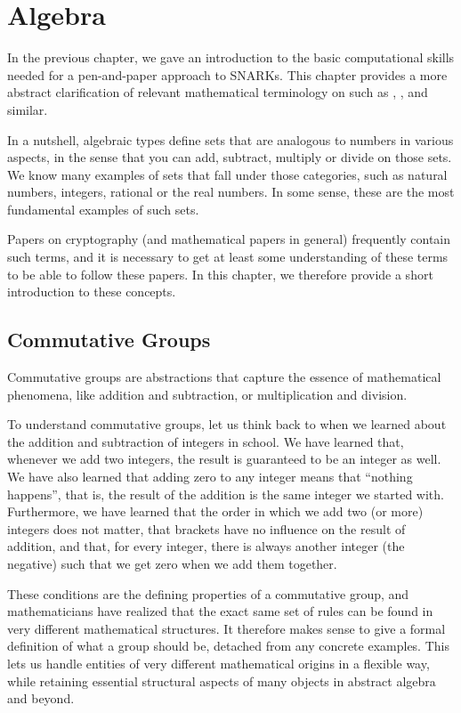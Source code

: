 \chapter{Algebra}

In the previous chapter, we gave an introduction to the basic computational skills needed for a pen-and-paper approach to SNARKs. This chapter provides a more abstract clarification of  relevant mathematical terminology on  such as , ,  and similar.

In a nutshell, algebraic types define sets that are analogous to numbers in various aspects, in the sense that you can add, subtract, multiply or divide on those sets.
We know many examples of sets that fall under those categories, such as natural numbers, integers,  rational or the real numbers. In some sense, these are the most fundamental examples of such sets.

Papers on cryptography (and mathematical papers in general) frequently contain such terms, and it is necessary to get at least some understanding of these terms to be able to follow these papers.
In this chapter, we therefore provide a short introduction to these concepts.

\section{Commutative Groups}\label{sec:groups}
Commutative groups are abstractions that capture the essence of mathematical phenomena, like addition and subtraction, or multiplication and division.

To understand commutative groups, let us think back to when we learned about the addition and subtraction of integers in school. We have learned that, whenever we add two integers, the result is guaranteed to be an integer as well. We have also learned that adding zero to any integer means that ``nothing happens'', that is, the result of the addition is the same integer we started with. Furthermore, we have learned that the order in which we add two (or more) integers does not matter, that brackets have no influence on the result of addition, and that, for every integer, there is always another integer (the negative) such that we get zero when we add them together.

These conditions are the defining properties of a commutative group, and mathematicians have realized that the exact same set of rules can be found in very different mathematical structures. It therefore makes sense to give a formal definition of what a group should be, detached from any concrete examples. This lets us handle entities of very different mathematical origins in a flexible way, while retaining essential structural aspects of many objects in abstract algebra and beyond.

